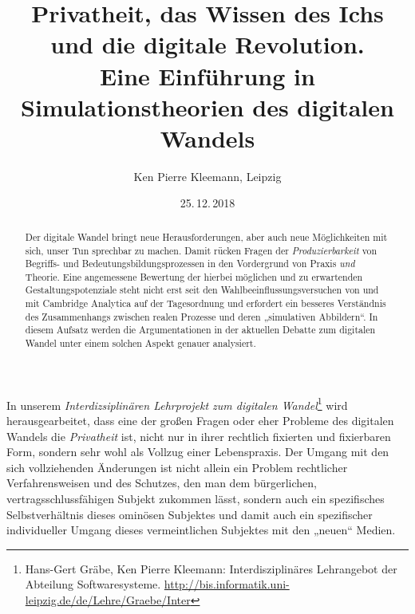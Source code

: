 \documentclass[12pt,a4paper]{article}
\title{Privatheit, das Wissen des Ichs\\ und die digitale Revolution.\\[12pt]
  \large Eine Einführung in Simulationstheorien des digitalen Wandels}
\author{Ken Pierre Kleemann, Leipzig}
\date{25.\,12.\,2018}
\begin{document}
\maketitle 

\begin{abstract}
  Der digitale Wandel bringt neue Herausforderungen, aber auch neue
  Möglichkeiten mit sich, unser Tun sprechbar zu machen.  Damit rücken Fragen
  der \emph{Produzierbarkeit} von Begriffs- und Bedeutungsbildungsprozessen in
  den Vordergrund von Praxis \emph{und} Theorie. Eine angemessene Bewertung
  der hierbei möglichen und zu erwartenden Gestaltungspotenziale steht nicht
  erst seit den Wahlbeeinflussungsversuchen von und mit Cambridge Analytica
  auf der Tagesordnung und erfordert ein besseres Verständnis des
  Zusammenhangs zwischen realen Prozesse und deren „simulativen Abbildern“.
  In diesem Aufsatz werden die Argumentationen in der aktuellen Debatte zum
  digitalen Wandel unter einem solchen Aspekt genauer analysiert.
\end{abstract}

In unserem \emph{Interdizsiplinären Lehrprojekt zum digitalen
  Wandel}\footnote{Hans-Gert Gräbe, Ken Pierre Kleemann: Interdisziplinäres
  Lehrangebot der Abteilung Softwaresysteme.
  \url{http://bis.informatik.uni-leipzig.de/de/Lehre/Graebe/Inter}} wird
herausgearbeitet, dass eine der großen Fragen oder eher Probleme des digitalen
Wandels die \emph{Privatheit} ist, nicht nur in ihrer rechtlich fixierten und
fixierbaren Form, sondern sehr wohl als Vollzug einer Lebenspraxis. Der Umgang
mit den sich vollziehenden Änderungen ist nicht allein ein Problem rechtlicher
Verfahrensweisen und des Schutzes, den man dem bürgerlichen,
vertragsschlussfähigen Subjekt zukommen lässt, sondern auch ein spezifisches
Selbstverhältnis dieses ominösen Subjektes und damit auch ein spezifischer
individueller Umgang dieses vermeintlichen Subjektes mit den „neuen“ Medien.
\end{document}
